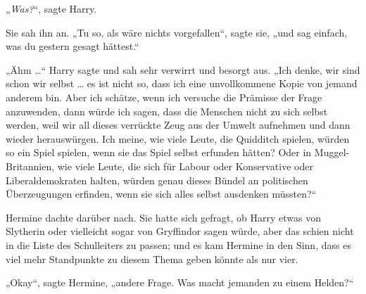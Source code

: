 „\emph{Was?}“, sagte Harry.

Sie sah ihn an.
„Tu so, als wäre nichts vorgefallen“, sagte sie, „und sag einfach, was du gestern gesagt hättest.“

„Ähm …“ Harry sagte und sah sehr verwirrt und besorgt aus.
„Ich denke, wir sind schon wir selbst … es ist nicht so, dass ich eine unvollkommene Kopie von jemand anderem bin. Aber ich schätze, wenn ich versuche die Prämisse der Frage anzuwenden, dann würde ich sagen, dass die Menschen nicht zu sich selbst werden, weil wir all dieses verrückte Zeug aus der Umwelt aufnehmen und dann wieder herauswürgen. Ich meine, wie viele Leute, die Quidditch spielen, würden so ein Spiel spielen, wenn sie das Spiel selbst erfunden hätten? Oder in Muggel-Britannien, wie viele Leute, die sich für Labour oder Konservative oder Liberaldemokraten halten, würden genau dieses Bündel an politischen Überzeugungen erfinden, wenn sie sich alles selbst ausdenken müssten?“

Hermine dachte darüber nach. Sie hatte sich gefragt, ob Harry etwas von Slytherin oder vielleicht sogar von Gryffindor sagen würde, aber das schien nicht in die Liste des Schulleiters zu passen; und es kam Hermine in den Sinn, dass es viel mehr Standpunkte zu diesem Thema geben könnte als nur vier.

„Okay“, sagte Hermine, „andere Frage. Was macht jemanden zu einem Helden?“

